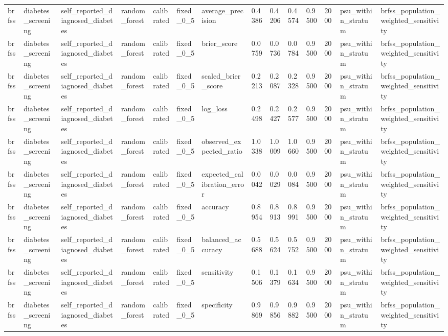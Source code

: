 \begin{tabular}{llllllllllllll}
brfss & diabetes\_screening & self\_reported\_diagnosed\_diabetes & random\_forest & calibrated & fixed\_0\_5 & average\_precision & 0.4386 & 0.4206 & 0.4574 & 0.9500 & 2000 & psu\_within\_stratum & brfss\_population\_weighted\_sensitivity \\
brfss & diabetes\_screening & self\_reported\_diagnosed\_diabetes & random\_forest & calibrated & fixed\_0\_5 & brier\_score & 0.0759 & 0.0736 & 0.0784 & 0.9500 & 2000 & psu\_within\_stratum & brfss\_population\_weighted\_sensitivity \\
brfss & diabetes\_screening & self\_reported\_diagnosed\_diabetes & random\_forest & calibrated & fixed\_0\_5 & scaled\_brier\_score & 0.2213 & 0.2087 & 0.2328 & 0.9500 & 2000 & psu\_within\_stratum & brfss\_population\_weighted\_sensitivity \\
brfss & diabetes\_screening & self\_reported\_diagnosed\_diabetes & random\_forest & calibrated & fixed\_0\_5 & log\_loss & 0.2498 & 0.2427 & 0.2577 & 0.9500 & 2000 & psu\_within\_stratum & brfss\_population\_weighted\_sensitivity \\
brfss & diabetes\_screening & self\_reported\_diagnosed\_diabetes & random\_forest & calibrated & fixed\_0\_5 & observed\_expected\_ratio & 1.0338 & 1.0009 & 1.0660 & 0.9500 & 2000 & psu\_within\_stratum & brfss\_population\_weighted\_sensitivity \\
brfss & diabetes\_screening & self\_reported\_diagnosed\_diabetes & random\_forest & calibrated & fixed\_0\_5 & expected\_calibration\_error & 0.0042 & 0.0029 & 0.0084 & 0.9500 & 2000 & psu\_within\_stratum & brfss\_population\_weighted\_sensitivity \\
brfss & diabetes\_screening & self\_reported\_diagnosed\_diabetes & random\_forest & calibrated & fixed\_0\_5 & accuracy & 0.8954 & 0.8913 & 0.8991 & 0.9500 & 2000 & psu\_within\_stratum & brfss\_population\_weighted\_sensitivity \\
brfss & diabetes\_screening & self\_reported\_diagnosed\_diabetes & random\_forest & calibrated & fixed\_0\_5 & balanced\_accuracy & 0.5688 & 0.5624 & 0.5752 & 0.9500 & 2000 & psu\_within\_stratum & brfss\_population\_weighted\_sensitivity \\
brfss & diabetes\_screening & self\_reported\_diagnosed\_diabetes & random\_forest & calibrated & fixed\_0\_5 & sensitivity & 0.1506 & 0.1379 & 0.1634 & 0.9500 & 2000 & psu\_within\_stratum & brfss\_population\_weighted\_sensitivity \\
brfss & diabetes\_screening & self\_reported\_diagnosed\_diabetes & random\_forest & calibrated & fixed\_0\_5 & specificity & 0.9869 & 0.9856 & 0.9882 & 0.9500 & 2000 & psu\_within\_stratum & brfss\_population\_weighted\_sensitivity \\

\end{tabular}
